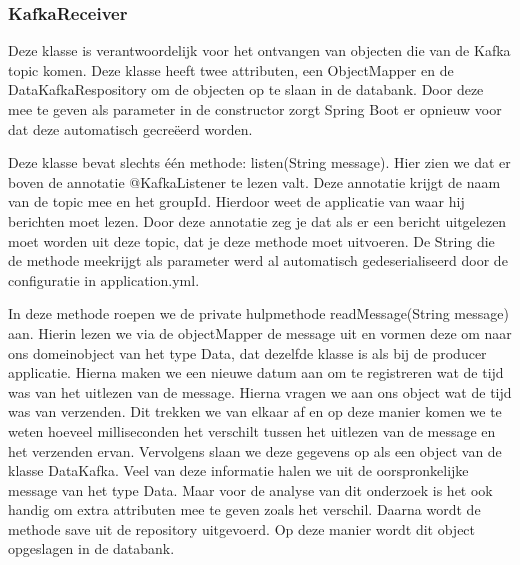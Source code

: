 \subsubsection{KafkaReceiver}
Deze klasse is verantwoordelijk voor het ontvangen van objecten die van de Kafka topic komen. Deze klasse heeft twee attributen, een ObjectMapper en de DataKafkaRespository om de objecten op te slaan in de databank. Door deze mee te geven als parameter in de constructor zorgt Spring Boot er opnieuw voor dat deze automatisch gecreëerd worden.

Deze klasse bevat slechts één methode: listen(String message). Hier zien we dat er boven de annotatie @KafkaListener te lezen valt. Deze annotatie krijgt de naam van de topic mee en het groupId. Hierdoor weet de applicatie van waar hij berichten moet lezen. Door deze annotatie zeg je dat als er een bericht uitgelezen moet worden uit deze topic, dat je deze methode moet uitvoeren. De String die de methode meekrijgt als parameter werd al automatisch gedeserialiseerd door de configuratie in application.yml. 

In deze methode roepen we de private hulpmethode readMessage(String message) aan. Hierin lezen we via de objectMapper de message uit en vormen deze om naar ons domeinobject van het type Data, dat dezelfde klasse is als bij de producer applicatie. Hierna maken we een nieuwe datum aan om te registreren wat de tijd was van het uitlezen van de message. Hierna vragen we aan ons object wat de tijd was van verzenden. Dit trekken we van elkaar af en op deze manier komen we te weten hoeveel milliseconden het verschilt tussen het uitlezen van de message en het verzenden ervan. Vervolgens slaan we deze gegevens op als een object van de klasse DataKafka. Veel van deze informatie halen we uit de oorspronkelijke message van het type Data. Maar voor de analyse van dit onderzoek is het ook handig om extra attributen mee te geven zoals het verschil. Daarna wordt de methode save uit de repository uitgevoerd. Op deze manier wordt dit object opgeslagen in de databank.

